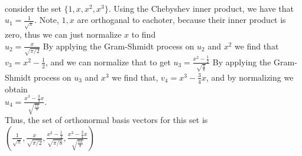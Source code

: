 \documentclass[letterpaper,12pt]{article}
\theoremstyle{definition}
\begin{document}
\\
consider the set $\{1,x,x^2,x^3\}$. Using the Chebyshev inner product, we have that \\
$u_1 = \frac{1}{\sqrt{\pi}}$. Note, $1, x$ are orthoganal to eachoter, because their inner product is zero, thus we can just normalize $x$ to find\\
$u_2 = \frac{x}{\sqrt{\pi/2}}$
By applying the Gram-Shmidt process on $u_2$ and $x^2$ we find that \\
$v_3 = x^2 - \frac{1}{2}$, and we can normalize that to get
$u_3 = \frac{x^2-\frac{1}{2}}{\sqrt{\frac{\pi}{8}}}$
By applying the Gram-Shmidt process on $u_3$ and $x^3$ we find that,
$v_4 = x^3 - \frac{3}{4}x$, and by normalizing we obtain\\
$u_4 = \frac{x^3 - \frac{3}{4}x}{\sqrt{\frac{7\pi}{8}}}$.\\
Thus, the set of orthonormal basis vectors for this set is \\
$( \frac{1}{\sqrt{\pi}},
\frac{x}{\sqrt{\pi/2}},
\frac{x^2-\frac{1}{2}}{\sqrt{\pi/8}},
\frac{x^3 - \frac{3}{4}x}{\sqrt{\frac{7\pi}{8}}} )$
\end{document}
